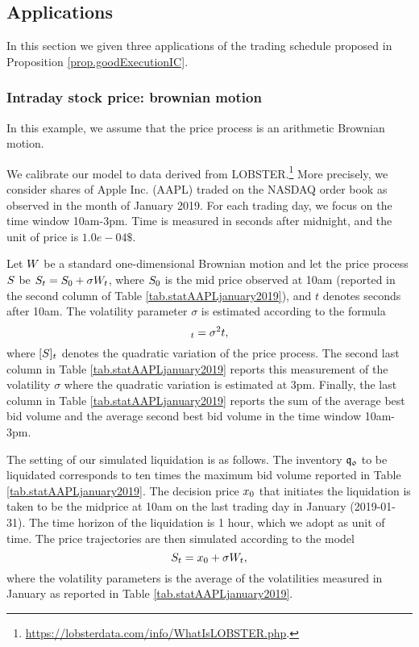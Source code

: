 \documentclass[10pt,a4paper]{article}
\begin{document}
\subsection{Applications}\label{sec.applications}
In this section we given three applications of the trading schedule proposed in Proposition \ref{prop.goodExecutionIC}.


\subsubsection{Intraday stock price: brownian motion}
In this example, we assume that the price process is an arithmetic Brownian motion.

We calibrate our model to data derived from LOBSTER.\footnote{\url{https://lobsterdata.com/info/WhatIsLOBSTER.php}.} More precisely, we consider shares of Apple Inc. (AAPL) traded on the NASDAQ order book as observed in the month of January 2019. For each trading day, we focus on the time window 10am-3pm. Time is measured in seconds after midnight, and the unit of price is $1.0e-04\$$. 

Let $W$ be a standard one-dimensional Brownian motion and let the price process $S$ be $S_t = S_0 + \sigma W_t$, where $S_0$ is the mid price observed at 10am (reported in the second column of Table \ref{tab.statAAPLjanuary2019}), and $t$ denotes seconds after 10am. The volatility parameter $\sigma$ is estimated according to the formula 
\begin{equation*}
[\fundamentalPrice]_t = \sigma\squared t,
\end{equation*}
where $[S]_t$ denotes the quadratic variation of the price process. The second last column in Table \ref{tab.statAAPLjanuary2019} reports this measurement of the volatility $\sigma$ where the quadratic variation is estimated at 3pm. Finally, the last column in Table \ref{tab.statAAPLjanuary2019} reports the sum of the average best bid volume and the average second best bid volume in the time window 10am-3pm.  

The setting of our simulated liquidation is as follows. The inventory $\mathfrak{q_0}$ to be liquidated corresponds to ten times the maximum bid volume reported in Table \ref{tab.statAAPLjanuary2019}. The decision price $x_0$  that initiates the liquidation is taken to be the midprice at 10am on the last trading day in January (2019-01-31). The time horizon of the liquidation is 1 hour, which we adopt as unit of time. The price trajectories are then simulated according to the model 
 \begin{equation}\label{eq.aBMmodelLiquidation}
 S_t = x_0 + \sigma W_t,
 \end{equation}
where the volatility parameters is the average of the volatilities measured in January as reported in Table \ref{tab.statAAPLjanuary2019}.
\end{document}
